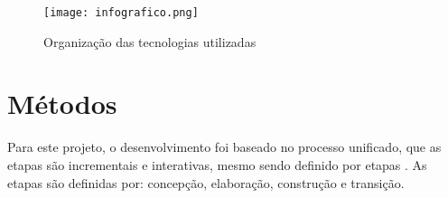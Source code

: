 \begin{figure}[H]
    \caption{\label{info}Organização das tecnologias utilizadas}
    \vspace{5pt}
    \centering
    \texttt{[image: infografico.png]}
    \vspace{5pt}
\end{figure}


\section{Métodos} \label{metodos}
Para este projeto, o desenvolvimento foi baseado no processo unificado, que as etapas são incrementais e interativas, mesmo sendo definido por etapas \cite{SOMMERVILE}. As etapas são definidas por: concepção, elaboração, construção e transição.



